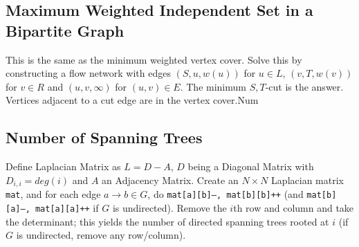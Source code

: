 \subsection{Maximum Weighted Independent Set in a Bipartite Graph}
This is the same as the minimum weighted vertex cover. Solve this by
constructing a flow network with edges $(S,u,w(u))$ for $u\in L$,
$(v,T,w(v))$ for $v\in R$ and $(u,v,\infty)$ for $(u,v)\in E$. The
minimum $S,T$-cut is the answer. Vertices adjacent to a cut edge are
in the vertex cover.Num




\subsection{Number of Spanning Trees}
		Define Laplacian Matrix as $L = D - A$, $D$ being a Diagonal Matrix with $D_{i,i} = deg(i)$ and $A$ an Adjacency Matrix.
		Create an $N\times N$ Laplacian matrix \texttt{mat}, and for each edge $a \rightarrow b \in G$, do
		\texttt{mat[a][b]--, mat[b][b]++} (and \texttt{mat[b][a]--, mat[a][a]++} if $G$ is undirected).
		Remove the $i$th row and column and take the determinant; this yields the number of directed spanning trees rooted at $i$
		(if $G$ is undirected, remove any row/column).

